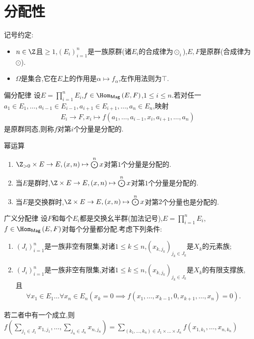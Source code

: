 \section{分配性}

记号约定:
\begin{itemize}
	\item $n\in\Z$且$\geq 1$,$\left(E_{i}\right)_{i=1}^{n}$是一族原群(诸$E_{i}$的合成律为$\odot_{i}$),$E,F$是原群(合成律为$\odot$).
	\item $\Omega$是集合,它在$E$上的作用是$\alpha\mapsto f_{\alpha}$,左作用法则为$\top$.
\end{itemize}

\begin{definition}{偏分配律}{}
	设$E=\prod\limits_{i=1}^{n}E_{i}$,$f\in\Hom_{\mathsf{Mag}}\left(E,F\right)$,$1\leq i\leq n$.若对任一$a_{1}\in E_{1},\ldots,a_{i-1}\in E_{i-1},a_{i+1}\in E_{i+1},\ldots,a_{n}\in E_{n}$,映射
	\begin{align*}
		E_{i}\to F,x_{i}\mapsto f\left(a_{1},\ldots,a_{i-1},x_{i},a_{i+1},\ldots,a_{n}\right)
	\end{align*}
	是原群同态,则称$f$对第$i$个分量是分配的.
\end{definition}

\begin{example}{幂运算}{}
	\begin{enumerate}
		\item $\Z_{>0}\times E\to E,\left(x,n\right)\mapsto\bigodot\limits^{n}x$对第$1$个分量是分配的.
		\item 当$E$是群时,$\Z\times E\to E,\left(x,n\right)\mapsto\bigodot\limits^{n}x$对第$1$个分量是分配的.
		\item 当$E$是交换群时,$\Z\times E\to E,\left(x,n\right)\mapsto\bigodot\limits^{n}x$对第$2$个分量也是分配的.
	\end{enumerate}
\end{example}

\begin{proposition}{广义分配律}{}
	设$F$和每个$E_{i}$都是交换幺半群(加法记号),$E=\prod\limits_{i=1}^{n}E_{i}$,$f\in\Hom_{\mathsf{Mag}}\left(E,F\right)$对每个分量都分配.考虑下列条件:
	\begin{enumerate}
		\item $\left(J_{i}\right)_{i=1}^{n}$是一族非空有限集,对诸$1\leq k\leq n$,$\left(x_{k,j_{k}}\right)_{j_{k}\in J_{k}}$是$X_{k}$的元素族;
		\item $\left(J_{i}\right)_{i=1}^{n}$是一族非空有限集,对诸$1\leq k\leq n$,$\left(x_{k,j_{k}}\right)_{j_{k}\in J_{k}}$是$X_{k}$的有限支撑族,且
		\begin{align*}
			\forall x_{1}\in E_{1}\ldots\forall x_{n}\in E_{n}\left(x_{k}=0\implies f\left(x_{1},\ldots,x_{k-1},0,x_{k+1},\ldots,x_{n}\right)=0\right).
		\end{align*}
	\end{enumerate}
	若二者中有一个成立,则$f\left(\sum\limits_{j_{1}\in J_{1}}x_{1,j_{1}},\ldots,\sum\limits_{j_{n}\in J_{n}}x_{n,j_{n}}\right)=\sum\limits_{\left(k_{1},\ldots,k_{n}\right)\in J_{1}\times\ldots\times J_{n}}f\left(x_{1,k_{1}},\ldots,x_{n,k_{n}}\right)$
\end{proposition}

